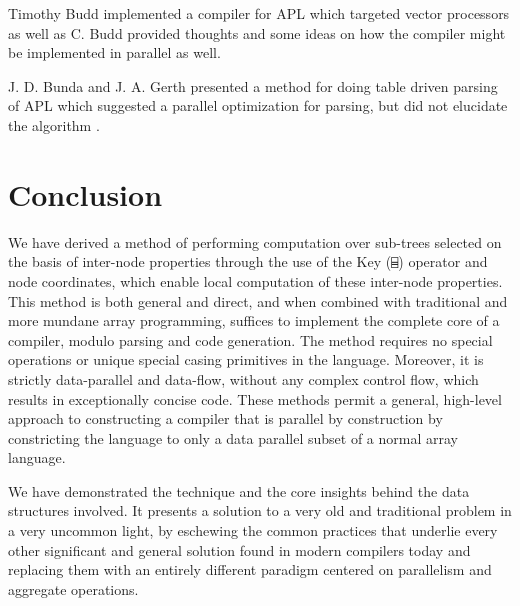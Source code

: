 ﻿\documentclass[numbers,10pt,preprint]{sigplanconf}
\begin{document}
Timothy Budd implemented a compiler \cite{budd1984apl,budd2012apl} for APL which targeted vector processors as well as C. Budd provided thoughts and some ideas on how the compiler might be implemented in parallel as well.

J. D. Bunda and J. A. Gerth presented a method for doing table driven parsing of APL which suggested a parallel optimization for parsing, but did not elucidate the algorithm \cite{bunda1984apl}.

\section{Conclusion}

We have derived a method of performing computation over sub-trees selected on the basis of inter-node properties through the use of the Key (\verb;⌸;) operator and node coordinates, which enable local computation of these inter-node properties. This method is both general and direct, and when combined with traditional and more mundane array programming, suffices to implement the complete core of a compiler, modulo parsing and code generation. The method requires no special operations or unique special casing primitives in the language. Moreover, it is strictly data-parallel and data-flow, without any complex control flow, which results in exceptionally concise code. These methods permit a general, high-level approach to constructing a compiler that is parallel by construction by constricting the language to only a data parallel subset of a normal array language.

We have demonstrated the technique and the core insights behind the data structures involved. It presents a solution to a very old and traditional problem in a very uncommon light, by eschewing the common practices that underlie every other significant and general solution found in modern compilers today and replacing them with an entirely different paradigm centered on parallelism and aggregate operations. 
\balancecolumns



\end{document}
